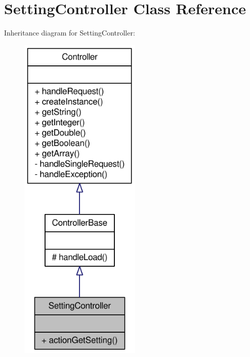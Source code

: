 \hypertarget{classSettingController}{
\section{SettingController Class Reference}
\label{classSettingController}
}


Inheritance diagram for SettingController:\nopagebreak
\begin{figure}[H]
\begin{center}
\leavevmode
\includegraphics[width=164pt]{classSettingController__inherit__graph}
\end{center}
\end{figure}


